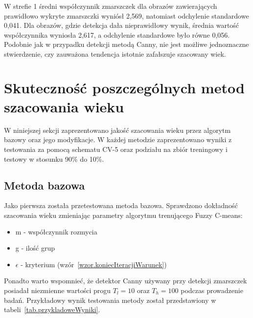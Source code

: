 \documentclass[a4paper,twoside,12pt]{book}
\begin{document}
    W strefie 1 średni współczynnik zmarszczek dla obrazów zawierających prawidłowo wykryte zmarszczki wyniósł 2,569,
    natomiast odchylenie standardowe 0,041. Dla obrazów, gdzie detekcja dała nieprawidłowy wynik, średnia wartość
    współczynnika wyniosła 2,617, a odchylenie standardowe było równe 0,056.
    Podobnie jak w przypadku detekcji metodą Canny, nie jest możliwe jednoznaczne stwierdzenie, czy zauważona
    tendencja istotnie zafałszuje szacowany wiek.
    \section{Skuteczność poszczególnych metod szacowania wieku}\label{sec:skuteczność-poszczególnych-metod-szacowania-wieku}
    W niniejszej sekcji zaprezentowano jakość szacowania wieku przez algorytm bazowy oraz jego modyfikacje. W każdej
    metodzie zaprezentowano wyniki z testowania za pomocą schematu CV-5 oraz podziału na zbiór treningowy i testowy w
    stosunku 90\% do 10\%.
    \subsection{Metoda bazowa}\label{subsec:metoda-bazowa}
    Jako pierwsza została przetestowana metoda bazowa.
    Sprawdzono dokładność szacowania wieku zmieniając parametry algorytmu trenującego Fuzzy C-means:
    \begin{itemize}
        \item m - współczynnik rozmycia
        \item g - ilość grup
        \item $\epsilon$ - kryterium (wzór~\ref{wzor.koniecIteracjiWarunek})
    \end{itemize}
    Ponadto warto wspomnieć, że detektor Canny używany przy detekcji zmarszczek posiadał niezmienne wartości progu
    $T_{l} = 10$ oraz $T_{h} = 100$ podczas prowadzenie badań.
    Przykładowy wynik testowania metody został przedstawiony w tabeli~\ref{tab.przykladoweWyniki}.
\end{document}
